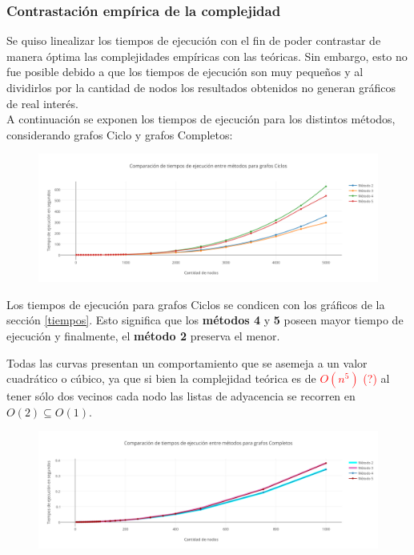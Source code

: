  \newpage
\subsubsection{Contrastaci\'on emp\'irica de la complejidad}

Se quiso linealizar los tiempos de ejecuci\'on con el fin de poder contrastar de manera \'optima las complejidades emp\'iricas con las te\'oricas. Sin embargo, esto no fue posible debido a que los tiempos de ejecuci\'on son muy peque\~nos y al dividirlos por la cantidad de nodos los resultados obtenidos no generan gr\'aficos de real inter\'es.\\

A continuaci\'on se exponen los tiempos de ejecuci\'on para los distintos m\'etodos, considerando grafos Ciclo y grafos Completos:

  \begin{figure}[h!]
   \begin{center}
 	\includegraphics[scale=0.55]{imagenes/local/tiempos/ciclos.png}
   \end{center}
 \end{figure} 
 
Los tiempos de ejecuci\'on para grafos Ciclos se condicen con los gr\'aficos de la secci\'on \ref{tiempos}. Esto significa que los \textbf{m\'etodos 4} y \textbf{5} poseen mayor tiempo de ejecuci\'on y finalmente, el \textbf{m\'etodo 2} preserva el menor.

Todas las curvas presentan un comportamiento que se asemeja a un valor cuadr\'atico  o c\'ubico, ya que si bien la complejidad te\'orica es de \textcolor{red}{$O(n^5)$ (?)} al tener s\'olo dos vecinos cada nodo las listas de adyacencia se recorren en $O(2)\subseteq O(1)$.
 
   \begin{figure}[h!]
   \begin{center}
 	\includegraphics[scale=0.55]{imagenes/local/tiempos/completos.png}
   \end{center}
 \end{figure} 
 
